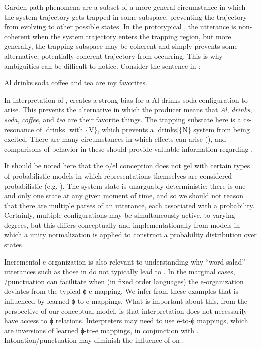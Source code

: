   Garden path phenomena are a subset of a more general circumstance in which the system trajectory gets trapped in some subspace, preventing the trajectory from evolving to other possible states. In the prototypical , the utterance is non-coherent when the system trajectory enters the trapping region, but more generally, the trapping subspace may be coherent and simply prevents some alternative, potentially coherent trajectory from occurring. This is why ambiguities can be difficult to notice. Consider the sentence in :

  \ea\label{ex:6:13}
    {Al drinks soda coffee and tea are my favorites.}
   \z
   
  In interpretation of ,  creates a strong bias for a {\textbar}Al drinks soda{\textbar} configuration to arise. This prevents the alternative  in which the producer means that \textit{Al}, \textit{drinks}, \textit{soda}, \textit{coffee}, and \textit{tea} are their favorite things. The trapping substate here is a cs-resonance of [drinks] with \{V\}, which prevents a [drinks]\{N\} system from being excited. There are many circumstances in which  effects can arise (\citealt{FFerreira2005,Pritchett1988}), and comparisons of behavior in these should provide valuable information regarding . 

  It should be noted here that the o/el conception does not gel with certain types of probabilistic models in which representations themselves are considered probabilistic (e.g. \citealt{ChaterManning2006,Manning2003}). The system state is unarguably deterministic: there is one and only one state at any given moment of time, and so we should not reason that there are multiple parses of an utterance, each associated with a probability. Certainly, multiple configurations may be simultaneously active, to varying degrees, but this differs conceptually and implementationally from models in which a unity normalization is applied to construct a probability distribution over states.

  Incremental e-organization is also relevant to understanding why “word salad” utterances such as those in  do not typically lead to . In the marginal cases, /punctuation can facilitate  when (in fixed order languages) the e-organization deviates from the typical ϕ-e mapping. We infer from these examples that  is influenced by learned ϕ-to-e mappings. What is important about this, from the perspective of our conceptual model, is that interpretation does not necessarily have access to ϕ relations. Interpreters may need to use e-to-ϕ mappings, which are inversions of learned ϕ-to-e mappings, in conjunction with . Intonation/punctuation may diminish the influence of  on . 


